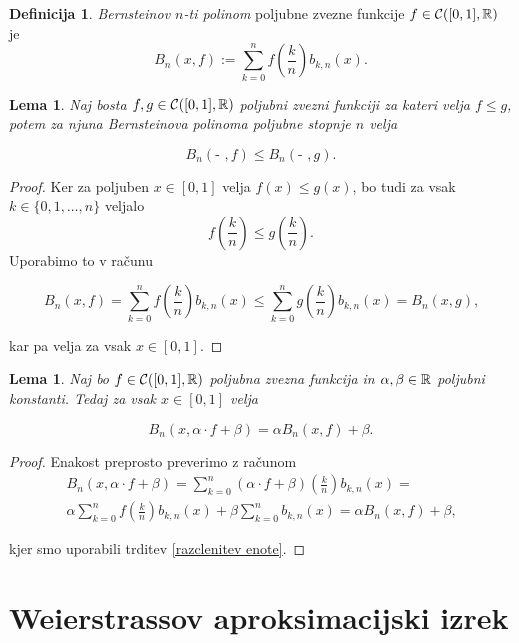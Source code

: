\documentclass[a4paper]{amsart}
\theoremstyle{theorem}
\newtheorem{lema}[izrek]{Lema}
\theoremstyle{definition}
\newtheorem{definicija}{Definicija}[section]
\begin{document}
\begin{definicija}
	\emph{Bernsteinov $n$-ti polinom} poljubne zvezne funkcije $f \in \mathcal{C}([0,1],\mathbb{R})$ je
	$$ B_n(x, f) := \sum_{k = 0}^n f\left(\frac kn\right)b_{k,n}(x)\text{.}$$

\end{definicija}

\begin{lema}
	Naj bosta $f, g \in \mathcal{C}([0,1],\mathbb{R})$ poljubni zvezni funkciji za kateri velja $f \leq g$, potem za
	njuna Bernsteinova polinoma poljubne stopnje $n$ velja

	$$ B_n(\text{- },f) \leq B_n(\text{- },g)\text{.}$$ 
\end{lema}

\begin{proof}
	Ker za poljuben $x \in [0,1]$ velja $f(x) \leq g(x)$, bo tudi za vsak $k \in \{0,1,\dots, n\}$
	veljalo
	$$ f\left(\frac kn\right) \leq g\left(\frac kn\right)\text{.}$$
	Uporabimo to v računu

	$$ B_n(x, f) = \sum_{k = 0}^n f\left(\frac kn\right)b_{k,n}(x) \leq 
	\sum_{k = 0}^n g\left(\frac kn\right)b_{k,n}(x) = B_n(x, g)\text{,}$$

	kar pa velja za vsak $x \in [0,1]$.
\end{proof}

\begin{lema}
	Naj bo $f \in \mathcal{C}([0,1],\mathbb{R})$ poljubna zvezna funkcija in $\alpha, \beta \in \mathbb{R}$ poljubni konstanti.
	Tedaj za vsak $x \in [0,1]$ velja 

	$$ B_n(x, \alpha \cdot f + \beta) = \alpha B_n(x, f) + \beta\text{.}$$
\end{lema}

\begin{proof}
	Enakost preprosto preverimo z računom
	\begin{multline*}
	B_n(x, \alpha \cdot f + \beta) = 
	\sum_{k = 0}^n (\alpha \cdot f + \beta)\left(\frac kn\right)b_{k,n}(x) =\\
	\alpha \sum_{k = 0}^n f\left(\frac kn\right)b_{k,n}(x) + \beta \sum_{k = 0}^n b_{k,n}(x) =
	\alpha B_n(x, f) + \beta\text{,}
\end{multline*}

kjer smo uporabili trditev \ref{razclenitev enote}.
\end{proof}


\newpage
\section{Weierstrassov aproksimacijski izrek}
\end{document}
